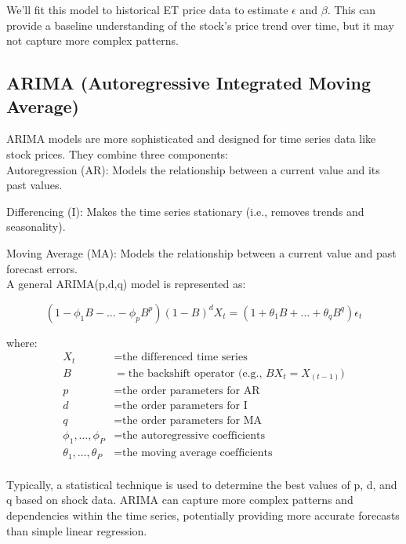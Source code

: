 \documentclass[9pt,a4paper,twoside]{tau}
\begin{document}
        We'll fit this model to historical ET price data to estimate $\epsilon$ and $\beta$. This can provide a baseline understanding of the stock's price trend over time, but it may not capture more complex patterns.




    \subsection{ARIMA (Autoregressive Integrated Moving Average)}
        
        ARIMA models are more sophisticated and designed for time series data like stock prices. They combine three components:\\
        
        Autoregression (AR): Models the relationship between a current value and its past values.
        
        Differencing (I): Makes the time series stationary (i.e., removes trends and seasonality).
        
        Moving Average (MA): Models the relationship between a current value and past forecast errors.\\
        
        
        A general ARIMA(p,d,q) model is represented as:
        
        \begin{equation}
        (1 - \phi_1B - \dots - \phi_pB^p)(1-B)^d X_t = (1 + \theta_1B + \dots + \theta_qB^q) \epsilon_t
        \end{equation}
        
        where:
        \begin{align*}
        X_t &= \text{the differenced time series}\\
        B &= \text{the backshift operator (e.g., $BX_t=X_(t−1)$)}\\
        p &= \text{the order parameters for AR}\\
        d &= \text{the order parameters for I}\\
        q &= \text{the order parameters for MA}\\
        \phi_1,  \dots ,  \phi_P &= \text{the autoregressive coefficients}\\
        \theta_1,  \dots ,  \theta_P &= \text{the moving average coefficients}\\
        \end{align*}  
           
         Typically, a statistical technique is used to determine the best values of p, d, and q based on shock data. ARIMA can capture more complex patterns and dependencies within the time series, potentially providing more accurate forecasts than simple linear regression.
\end{document}
